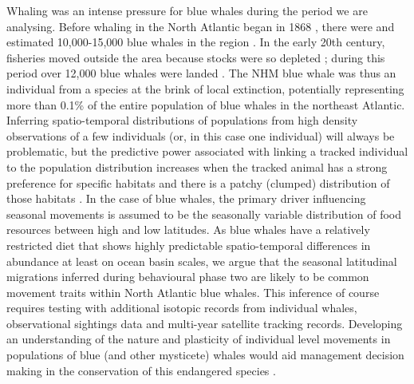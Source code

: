 \documentclass[a4paper,12pt]{article}
\begin{document}
Whaling was an intense pressure for blue whales during the period we are analysing. 
Before whaling in the North Atlantic began in 1868 \citep{reilly2008balaenoptera}, there were and estimated 10,000-15,000 blue whales in the region \citep{sigurjonsson1995life}. 
In the early 20th century, fisheries moved outside the area because stocks were so depleted \citep{reilly2008balaenoptera}; during this period over 12,000 blue whales were landed \citep{sigurjonsson1995life}.
The NHM blue whale was thus an individual from a species at the brink of local extinction, potentially representing more than 0.1\% of the entire population of blue whales in the northeast Atlantic. 
Inferring spatio-temporal distributions of populations from high density observations of a few individuals (or, in this case one individual) will always be problematic, but the predictive power associated with linking a tracked individual to the population distribution increases when the tracked animal has a strong preference for specific habitats and there is a patchy (clumped) distribution of those habitats \citep{holdo2013inferring}. 
In the case of blue whales, the primary driver influencing seasonal movements is assumed to be the seasonally variable distribution of food resources between high and low latitudes. 
As blue whales have a relatively restricted diet that shows highly predictable spatio-temporal differences in abundance at least on ocean basin scales, we argue that the seasonal latitudinal migrations inferred during behavioural phase two are likely to be common movement traits within North Atlantic blue whales. 
This inference of course requires testing with additional isotopic records from individual whales, observational sightings data and multi-year satellite tracking records. 
Developing an understanding of the nature and plasticity of individual level movements in populations of blue (and other mysticete) whales would aid management decision making in the conservation of this endangered species \citep{irvine2017quantifying}.
\end{document}
